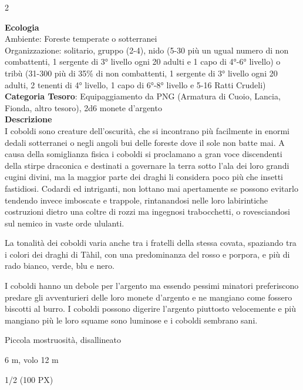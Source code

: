 \begin{multicols}{2}
{\textbf{Ecologia}\\
Ambiente: Foreste temperate o sotterranei\\
Organizzazione: solitario, gruppo (2-4), nido (5-30 più un ugual numero di non combattenti, 1 sergente di 3° livello ogni 20 adulti e 1 capo di 4°-6° livello) o tribù (31-300 più di 35\% di non combattenti, 1 sergente di 3° livello ogni 20 adulti, 2 tenenti di 4° livello, 1 capo di 6°-8° livello e 5-16 Ratti Crudeli)\\
\textbf{Categoria Tesoro}: Equipaggiamento da PNG (Armatura di Cuoio, Lancia, Fionda, altro tesoro), 2d6 monete d'argento\\
\textbf{Descrizione}\\
I coboldi sono creature dell'oscurità, che si incontrano più facilmente in enormi dedali sotterranei o negli angoli bui delle foreste dove il sole non batte mai. A causa della somiglianza fisica i coboldi si proclamano a gran voce discendenti della stirpe draconica e destinati a governare la terra sotto l'ala dei loro grandi cugini divini, ma la maggior parte dei draghi li considera poco più che insetti fastidiosi. Codardi ed intriganti, non lottano mai apertamente se possono evitarlo tendendo invece imboscate e trappole, rintanandosi nelle loro labirintiche costruzioni dietro una coltre di rozzi ma ingegnosi trabocchetti, o rovesciandosi sul nemico in vaste orde ululanti.

La tonalità dei coboldi varia anche tra i fratelli della stessa covata, spaziando tra i colori dei draghi di Tàhil, con una predominanza del rosso e porpora, e più di rado bianco, verde, blu e nero.

I coboldi hanno un debole per l'argento ma essendo pessimi minatori preferiscono predare gli avventurieri delle loro monete d'argento e ne mangiano come fossero biscotti al burro. I coboldi possono digerire l'argento piuttosto velocemente e più mangiano più le loro squame sono luminose e i coboldi sembrano sani.

\begin{description}[noitemsep, topsep=0pt, parsep=0pt, partopsep=0pt, itemsep=1pt, leftmargin=2.35cm,  labelwidth=2.2cm, itemindent=0cm, listparindent=0pt] %
\setlength{\baselineskip}{10pt}
\item[\textbf{Taglia/Tipo}] Piccola mostruosità, disallineato
\item[\textbf{Caratt.}] 
\item[\textbf{Punti Ferita}] 
\item[\textbf{Movimento}] 6 m, volo 12 m
\item[\textbf{Tiri Salvez.}] 
\item[\textbf{Sensi}] 
\item[\textbf{Sfida}] 1/2 (100 PX)
\end{description}
\smallskip

}
\end{multicols}
